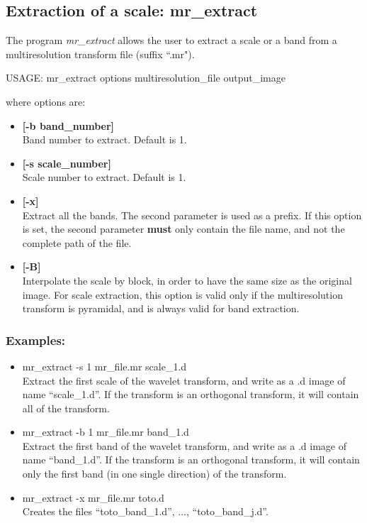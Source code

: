 \clearpage

\subsection{Extraction of a scale: mr\_extract}
\label{sect_extr}
The program {\em mr\_extract} allows the user to extract a scale or a band from
a multiresolution transform file (suffix ``.mr").
{\bf
\begin{center}
 USAGE: mr\_extract options multiresolution\_file  output\_image
\end{center}}
where options are:
\begin{itemize}
\baselineskip=0.4truecm
\itemsep=0.1truecm
\item {\bf  [-b band\_number] } \\
 Band number to extract. Default is 1.
\item {\bf  [-s scale\_number] } \\
 Scale number to extract. Default is 1.
\item {\bf  [-x]} \\
Extract all the bands. The second parameter is used
as a prefix. If this option is set, the second parameter {\bf must} only
contain the file name, and not the complete path of the file.
\item {\bf   [-B]} \\
Interpolate the scale by block, in order to have the same
size as the original image. For scale extraction, 
this option is valid only if the 
 multiresolution transform is pyramidal, and is always valid for
 band extraction.
\end{itemize}
\subsubsection*{Examples:}
\begin{itemize}
\baselineskip=0.4truecm
\itemsep=0.1truecm
\item mr\_extract -s 1 mr\_file.mr scale\_1.d \\
Extract the first scale of the wavelet transform, and write as a .d
image of name ``scale\_1.d''. If the transform is an orthogonal transform,
it will contain all of the transform.
\item mr\_extract -b 1 mr\_file.mr band\_1.d \\
Extract the first band of the wavelet transform, and write as a .d
image of name ``band\_1.d''. If the transform is an orthogonal transform,
it will contain only the first band (in one single direction)
of the transform.
\item mr\_extract -x  mr\_file.mr toto.d\\
Creates the files ``toto\_band\_1.d'', ..., ``toto\_band\_j.d''. 
\end{itemize}

